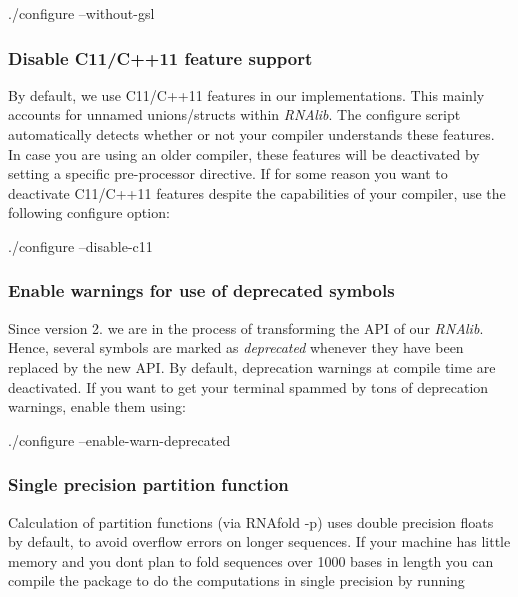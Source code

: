 \begin{DoxyVerb}./configure --without-gsl
\end{DoxyVerb}
\hypertarget{install_config_c11}{}\subsubsection{Disable C11/\+C++11 feature support}\label{install_config_c11}
By default, we use C11/\+C++11 features in our implementations. This mainly accounts for unnamed unions/structs within {\itshape R\+N\+Alib}. The configure script automatically detects whether or not your compiler understands these features. In case you are using an older compiler, these features will be deactivated by setting a specific pre-\/processor directive. If for some reason you want to deactivate C11/\+C++11 features despite the capabilities of your compiler, use the following configure option\+:

\begin{DoxyVerb}./configure --disable-c11
\end{DoxyVerb}
\hypertarget{install_config_deprecated}{}\subsubsection{Enable warnings for use of deprecated symbols}\label{install_config_deprecated}
Since version 2. we are in the process of transforming the A\+PI of our {\itshape R\+N\+Alib}. Hence, several symbols are marked as {\itshape deprecated} whenever they have been replaced by the new A\+PI. By default, deprecation warnings at compile time are deactivated. If you want to get your terminal spammed by tons of deprecation warnings, enable them using\+:

\begin{DoxyVerb}./configure --enable-warn-deprecated
\end{DoxyVerb}
\hypertarget{install_config_float_pf}{}\subsubsection{Single precision partition function}\label{install_config_float_pf}
Calculation of partition functions (via R\+N\+Afold -\/p) uses double precision floats by default, to avoid overflow errors on longer sequences. If your machine has little memory and you don\textquotesingle{}t plan to fold sequences over 1000 bases in length you can compile the package to do the computations in single precision by running


